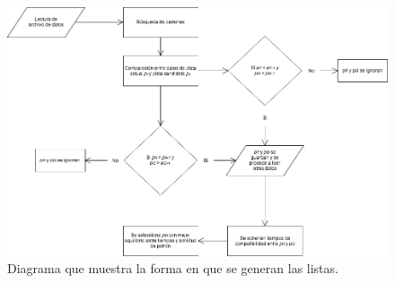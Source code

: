 \begin{landscape}
\begin{figure}
\centering
\includegraphics[width=22cm]{./Figuras/diagram3}
\caption[Generaci\'on de listas de reproducci\'on]{Diagrama que muestra la forma en que se generan las listas.}
\label{fig:diaglist}
\end{figure}
\end{landscape}